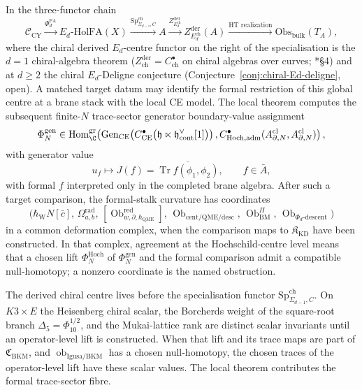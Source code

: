 In the three-functor chain
\[
  \mathcal C_{\mathrm{CY}}
  \xrightarrow{\Phi^{\mathrm{FA}}_d}
  E_d\text{-}\mathrm{HolFA}(X)
  \xrightarrow{\mathrm{Sp}^{\mathrm{ch}}_{\Sigma_{d-1},C}}
  A
  \xrightarrow{Z^{\mathrm{der}}_{E_d^{\mathrm{ch}}}}
  Z^{\mathrm{der}}_{E_d^{\mathrm{ch}}}(A)
  \xrightarrow{\text{HT realization}}
  \mathrm{Obs}_{\mathrm{bulk}}(T_A),
\]
where the chiral derived $E_d$-centre functor on the right of the
specialisation is the \(d=1\) chiral-algebra theorem
($Z^{\mathrm{der}}_{\mathrm{ch}}=C^\bullet_{\mathrm{ch}}$ on chiral
algebras over curves; \cite{beilinson-drinfeld-chiral}*{\S 4}) and at
$d\geq 2$ the chiral $E_d$-Deligne conjecture
(Conjecture~\ref{conj:chiral-Ed-deligne}, open).  A matched target
datum may identify the formal restriction of this global centre at a
brane stack with the local CE model.  The local theorem computes the
  subsequent finite-\(N\) trace-sector generator boundary-value assignment
\[
  \Phi_N^{\mathrm{gen}}
  \in
  \operatorname{Hom}^{\mathrm{gr}}_\C\!\left(
    \operatorname{Gen}_{\mathrm{CE}}\!\left(
      C^\bullet_{\mathrm{CE}}\bigl(
        \mathfrak h\ltimes\mathfrak h^\vee_{\mathrm{cont}}[1]\bigr)\right),
    C^\bullet_{\mathrm{Hoch},\mathrm{adm}}
      (A^{\mathrm{cl}}_{\partial,N},A^{\mathrm{cl}}_{\partial,N})\right),
\]
with generator value
\[
  u_f\longmapsto
  J(f)=\overline{\operatorname{Tr}f(\phi_1,\phi_2)},\qquad f\in\bar A,
\]
with formal \(f\) interpreted only in the completed brane algebra.
After such a target comparison, the formal-stalk curvature has
coordinates
\[
  \bigl(\hbar_{\mathrm{W}}N[\bar c],\,\Omega^{\mathrm{rad}}_{a,b},\,
   [\operatorname{Ob}^{\mathrm{red}}_{w,\partial,\hbar_{\mathrm{QME}}}],\,
   \operatorname{Ob}_{\mathrm{cent/QME/desc}},\,
   \operatorname{Ob}^{\Pi}_{\mathrm{BM}},\,
   \operatorname{Ob}_{\Phi_d\text{-descent}}\bigr)
\]
in a common deformation complex, when the comparison maps to
\(\mathfrak K_{\mathrm{KD}}\) have been constructed.  In that complex,
  agreement at the Hochschild-centre level means that a chosen lift
  \(\Phi_N^{\mathrm{Hoch}}\) of \(\Phi_N^{\mathrm{gen}}\) and the formal
  comparison admit a compatible null-homotopy; a nonzero coordinate is
  the named obstruction.

The derived chiral centre lives before the specialisation functor
\(\mathrm{Sp}^{\mathrm{ch}}_{\Sigma_{d-1},C}\).  On \(K3\times E\) the
Heisenberg chiral scalar, the Borcherds weight of the square-root branch
\(\Delta_5=\Phi_{10}^{1/2}\), and the Mukai-lattice rank are
distinct scalar invariants until an operator-level lift is constructed.
When that lift and its trace maps are part of
\(\mathfrak C_{\mathrm{BKM}}\), and
\(\operatorname{ob}_{\mathrm{Igusa/BKM}}\) has a chosen null-homotopy,
the chosen traces of the operator-level lift have these scalar values.  The
local theorem contributes the formal trace-sector fibre.

